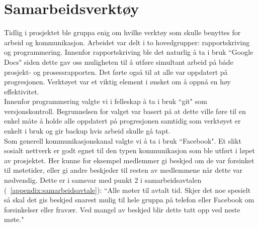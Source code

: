 \section{Samarbeidsverktøy}
Tidlig i prosjektet ble gruppa enig om hvilke verktøy som skulle benyttes for arbeid og kommunikasjon. Arbeidet var delt i to hovedgrupper: rapportskriving og programmering. Innenfor rapportskriving ble det naturlig å ta i bruk ``Google Docs" siden dette gav oss muligheten til å utføre simultant arbeid på både prosjekt- og prosessrapporten. Det førte også til at alle var oppdatert på progresjonen. Verktøyet var et viktig element i ønsket om å oppnå en høy effektivitet.\\

Innenfor programmering valgte vi i felleskap å ta i bruk ``git" som versjonskontroll. Begrunnelsen for valget var basert på at dette ville føre til en enkel måte å holde alle oppdatert på progresjonen samtidig som verktøyet er enkelt i bruk og gir backup hvis arbeid skulle gå tapt.\\

Som generell kommunikasjonskanal valgte vi å ta i bruk ``Facebook". Et slikt sosialt nettverk er godt egnet til den typen kommunikasjon som ble utført i løpet av prosjektet. Her kunne for eksempel medlemmer gi beskjed om de var forsinket til møtetider, eller gi andre beskjeder til resten av medlemmene når dette var nødvendig. Dette er i samsvar med punkt 2 i samarbeidsavtalen (~\ref{appendix:samarbeidsavtale}): ``Alle møter til avtalt tid. Skjer det noe spesielt så skal det gis beskjed snarest mulig til hele gruppa på telefon eller Facebook om forsinkelser eller fravær. Ved mangel av beskjed blir dette tatt opp ved neste møte."\\
